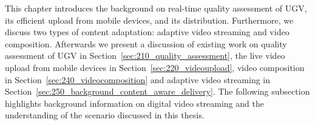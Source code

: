 This chapter introduces the background on real-time quality assessment of \ac{UGV}, its efficient upload from mobile devices, and its distribution.
Furthermore, we discuss two types of content adaptation: adaptive video streaming and video composition.
Afterwards we present a discussion of existing work on quality assessment of \ac{UGV} in Section~\ref{sec:210_quality_assessment}, the live video upload from mobile devices in Section~\ref{sec:220_videoupload}, video composition in Section~\ref{sec:240_videocomposition} and adaptive video streaming in Section~\ref{sec:250_background_content_aware_delivery}.
The following subsection highlights background information on digital video streaming and the understanding of the scenario discussed in this thesis.